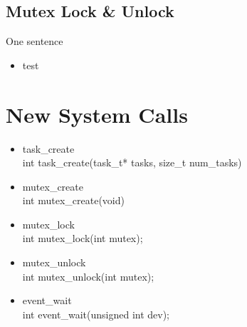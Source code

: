 \documentclass{article}
\begin{document}
\subsection{Mutex Lock \& Unlock}	
One sentence
 \begin{itemize}
	  \setlength{\itemsep}{1pt}
	  \setlength{\parskip}{0pt}
	  \setlength{\parsep}{0pt}
	  \item test
\end{itemize}


\section{New System Calls}
\begin{itemize}
\item{task\_create}\\
	int task\_create(task\_t* tasks, size\_t num\_tasks)\\
	\newline
	{}

\item{mutex\_create}\\
	int mutex\_create(void)\\
	\newline
	{}

\item{mutex\_lock}\\
	int mutex\_lock(int mutex);\\
	\newline
	{}

\item{mutex\_unlock}\\
	int mutex\_unlock(int mutex);\\
	\newline
	{}

\item{event\_wait}\\
	int event\_wait(unsigned int dev);\\
	\newline
	{}
\end{itemize}


	
 
\end{document}
